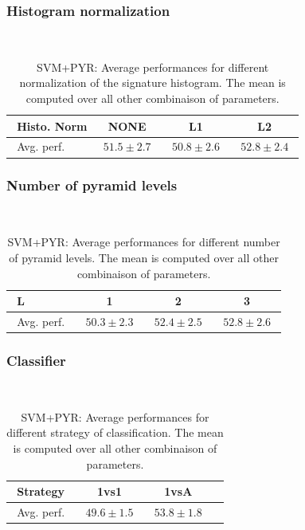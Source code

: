 \documentclass[10pt,a4paper]{llncs}
\begin{document}
\subsubsection{Histogram normalization}$~$\\

\begin{table}[H]
\centering
\caption{SVM+PYR: Average performances for different normalization of the signature histogram. The mean is computed over all other combinaison of parameters.}
\label{table:SVM_PYR:Histonorm}
\begin{tabular}{|l|c|c|c|}
\hline
$~~$Histo. Norm & NONE & L1 & L2 \\ \hline
$~~$Avg. perf.$~~$ & $~~51.5\pm2.7~~$ & $~~50.8\pm2.6~~$ & $~~\mathbf{52.8\pm2.4}~~$ \\ \hline
\end{tabular}
\end{table}


\subsubsection{Number of pyramid levels}$~$\\

\begin{table}[H]
\centering
\caption{SVM+PYR: Average performances for different number of pyramid levels. The mean is computed over all other combinaison of parameters.}
\label{table:SVM_PYR:Kernel}
\begin{tabular}{|l|c|c|c|}
\hline
$~~$L & 1 & 2 & 3 \\ \hline
$~~$Avg. perf.$~~$ & $~~50.3\pm2.3~~$ & $~~52.4\pm2.5~~$ & $~~\mathbf{52.8\pm2.6}~~$ \\ \hline
\end{tabular}
\end{table}

\subsubsection{Classifier}$~$\\

\begin{table}[H]
\centering
\caption{SVM+PYR: Average performances for different strategy of classification. The mean is computed over all other combinaison of parameters.}
\label{table:SVM_PYR:Classifier}
\begin{tabular}{|l|c|c|c|}
\hline
$~~$Strategy & 1vs1 & 1vsA \\ \hline
$~~$Avg. perf.$~~$ & $~~49.6\pm1.5~~$ & $~~\mathbf{53.8\pm1.8}~~$ \\ \hline
\end{tabular}
\end{table}
\end{document}
